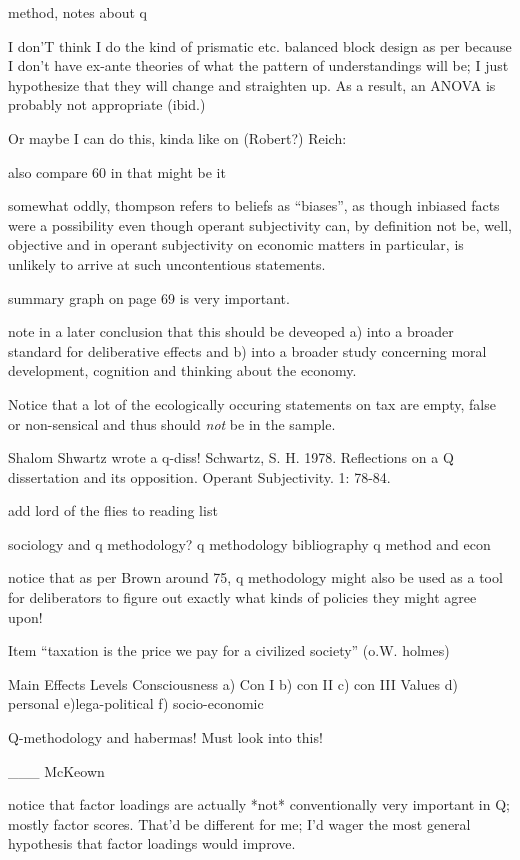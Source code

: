 
method, notes about q

I don'T think I do the kind of prismatic etc. balanced block design as per \cite[30][]{Brown1980} because I don't have ex-ante theories of what the pattern of understandings will be; I just hypothesize that they will change and straighten up.
As a result, an ANOVA is probably not appropriate (ibid.)

Or maybe I can do this, kinda like \cite[35]{Brown1980} on (Robert?) Reich:

also compare 60 in \cite[35]{Brown1980} that might be it

somewhat oddly, thompson refers to beliefs as ``biases'', as though inbiased facts were a possibility even though operant subjectivity can, by definition not be, well, objective and in operant subjectivity on economic matters in particular, is unlikely to arrive at such uncontentious statements.

summary graph on page 69 is very important.

note in a later conclusion that this should be deveoped a) into a broader standard for deliberative effects and b) into a broader study concerning moral development, cognition and thinking about the economy.

Notice that a lot of the ecologically occuring statements on tax are empty, false or non-sensical and thus should \emph{not} be in the sample.

Shalom Shwartz wrote a q-diss!
	Schwartz, S. H. 1978. Reflections on a Q dissertation and its opposition. Operant
Subjectivity. 1: 78-84.

add lord of the flies to reading list

sociology and q methodology?
q methodology bibliography
q method and econ

notice that as per Brown around 75, q methodology might also be used as a tool for deliberators to figure out exactly what kinds of policies they might agree upon!

Item ``taxation is the price we pay for a civilized society'' (o.W. holmes)


Main Effects		Levels
Consciousness 		a) Con I  	b) con II 	c) con III
Values  			d) personal 	e)lega-political 	f) socio-economic

Q-methodology and habermas! Must look into this!

___
McKeown

notice that factor loadings are actually *not* conventionally very important in Q; mostly factor scores. That'd be different for me; I'd wager the most general hypothesis that factor loadings would improve.

